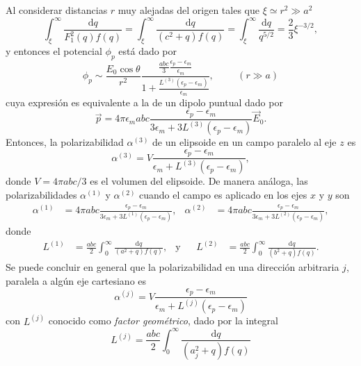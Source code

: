 Al considerar distancias $r$ muy alejadas del origen tales que $\xi\simeq r^2\gg a^2$
\begin{equation*}
    \int_{\xi}^{\infty}\frac{\text{d}q}{F_1^2(q)f(q)}= \int_{\xi}^{\infty}\frac{\text{d}q}{(c^2+q)f(q)}=\int_{\xi}^{\infty}\frac{\text{d}q}{q^{5/2}}=\frac{2}{3}\xi^{-3/2},
\end{equation*}
y entonces el potencial $\phi_p$ está dado por
\begin{equation}
    \phi_p\sim\frac{E_0\cos\theta}{r^2}\frac{\frac{abc}{3}\frac{\epsilon_p-\epsilon_m}{\epsilon_m}}{1+\frac{L^{(3)}(\epsilon_p-\epsilon_m)}{\epsilon_m}},\hspace{1cm}(r\gg a)
\end{equation}
cuya expresión es equivalente a la de un dipolo puntual dado por
\begin{equation}
    \Vec{p}=4\pi\epsilon_m abc\frac{\epsilon_p-\epsilon_m}{3\epsilon_m+3L^{(3)}(\epsilon_p-\epsilon_m)}\Vec{E}_0
    \label{momento_dip}.
\end{equation}
Entonces, la polarizabilidad $\alpha^{(3)}$ de un elipsoide en un campo paralelo al eje $z$ es
\begin{equation}
    \alpha^{(3)}=V\frac{\epsilon_p-\epsilon_m}{\epsilon_m+L^{(3)}(\epsilon_p-\epsilon_m)},
\end{equation}
donde $V=4\pi abc/3$ es el volumen del elipsoide. De manera análoga, las polarizabilidades $ \alpha^{(1)}$ y $ \alpha^{(2)}$ cuando el campo es aplicado en los ejes $x$ y $y$ son
\begin{align*}
    \alpha^{(1)}&=4\pi abc \frac{\epsilon_p-\epsilon_m}{3\epsilon_m+3L^{(1)}(\epsilon_p-\epsilon_m)},&
    \alpha^{(2)}&=4\pi abc \frac{\epsilon_p-\epsilon_m}{3\epsilon_m+3L^{(2)}(\epsilon_p-\epsilon_m)},
\end{align*}
donde 
\begin{align*}
    L^{(1)}&=\frac{abc}{2}\int_{0}^{\infty}\frac{\text{d}q}{(a^2+q)f(q)},&\text{y} && 
    L^{(2)}&=\frac{abc}{2}\int_{0}^{\infty}\frac{\text{d}q}{(b^2+q)f(q)}.
\end{align*}
Se puede concluir en general que la polarizabilidad en una dirección arbitraria $j$, paralela a algún eje cartesiano es
\begin{equation}
    \alpha^{(j)}=V\frac{\epsilon_p-\epsilon_m}{\epsilon_m+L^{(j)}(\epsilon_p-\epsilon_m)}
\end{equation}
con $L^{(j)}$ conocido como \textit{factor geométrico}, dado por la integral 
\begin{equation}
    L^{(j)}=\frac{abc}{2}\int_0^{\infty}\frac{\text{d}q}{(a_j^2+q)f(q)}
\end{equation}
